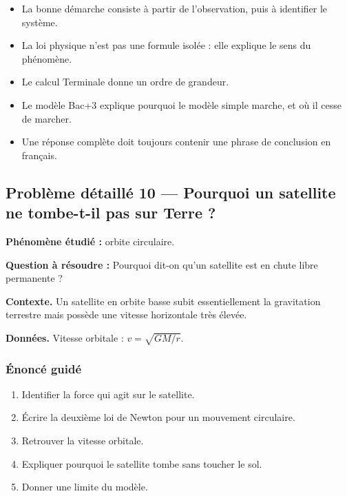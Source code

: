 \documentclass[11pt,a4paper]{article}
\begin{document}
\begin{methodebox}
\begin{itemize}
  \item La bonne démarche consiste à partir de l'observation, puis à identifier le système.
  \item La loi physique n'est pas une formule isolée : elle explique le sens du phénomène.
  \item Le calcul Terminale donne un ordre de grandeur.
  \item Le modèle Bac+3 explique pourquoi le modèle simple marche, et où il cesse de marcher.
  \item Une réponse complète doit toujours contenir une phrase de conclusion en français.
\end{itemize}
\end{methodebox}

\subsection{Problème détaillé 10 — Pourquoi un satellite ne tombe-t-il pas sur Terre ?}

\begin{exercicebox}
\textbf{Phénomène étudié :} orbite circulaire.

\medskip
\textbf{Question à résoudre :} Pourquoi dit-on qu'un satellite est en chute libre permanente ?

\medskip
\textbf{Contexte.} Un satellite en orbite basse subit essentiellement la gravitation terrestre mais possède une vitesse horizontale très élevée.

\medskip
\textbf{Données.} Vitesse orbitale : \(v=\sqrt{GM/r}\).
\end{exercicebox}

\subsubsection*{Énoncé guidé}

\begin{enumerate}
  \item Identifier la force qui agit sur le satellite.
  \item Écrire la deuxième loi de Newton pour un mouvement circulaire.
  \item Retrouver la vitesse orbitale.
  \item Expliquer pourquoi le satellite tombe sans toucher le sol.
  \item Donner une limite du modèle.
\end{enumerate}
\end{document}
